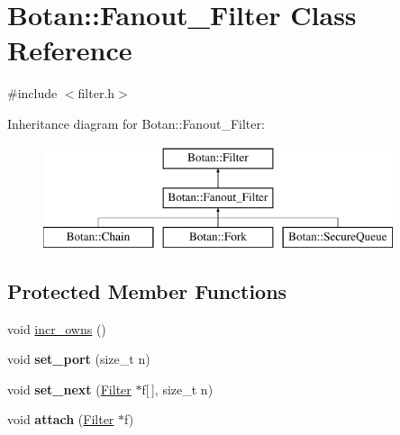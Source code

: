 \hypertarget{classBotan_1_1Fanout__Filter}{\section{Botan\-:\-:Fanout\-\_\-\-Filter Class Reference}
\label{classBotan_1_1Fanout__Filter}
}


{\ttfamily \#include $<$filter.\-h$>$}

Inheritance diagram for Botan\-:\-:Fanout\-\_\-\-Filter\-:\begin{figure}[H]
\begin{center}
\leavevmode
\includegraphics[height=3.000000cm]{classBotan_1_1Fanout__Filter}
\end{center}
\end{figure}
\subsection*{Protected Member Functions}
\begin{DoxyCompactItemize}
\item 
void \hyperlink{classBotan_1_1Fanout__Filter_a029823feb2cd11de5d301f864883db29}{incr\-\_\-owns} ()
\item 
\hypertarget{classBotan_1_1Fanout__Filter_acea24311be541eabaa368dbd2fa94939}{void {\bfseries set\-\_\-port} (size\-\_\-t n)}\label{classBotan_1_1Fanout__Filter_acea24311be541eabaa368dbd2fa94939}

\item 
\hypertarget{classBotan_1_1Fanout__Filter_ab83e92058564eaba5d7e90822ec46c03}{void {\bfseries set\-\_\-next} (\hyperlink{classBotan_1_1Filter}{Filter} $\ast$f\mbox{[}$\,$\mbox{]}, size\-\_\-t n)}\label{classBotan_1_1Fanout__Filter_ab83e92058564eaba5d7e90822ec46c03}

\item 
\hypertarget{classBotan_1_1Fanout__Filter_adf2b2f749ec5def226c925ca9ef26dbc}{void {\bfseries attach} (\hyperlink{classBotan_1_1Filter}{Filter} $\ast$f)}\label{classBotan_1_1Fanout__Filter_adf2b2f749ec5def226c925ca9ef26dbc}

\end{DoxyCompactItemize}
